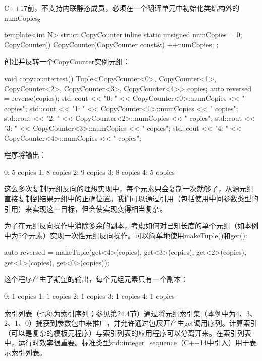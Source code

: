 \begin{notice}
C++17前，不支持内联静态成员，必须在一个翻译单元中初始化类结构外的numCopies。
\end{notice}

\begin{cpp}
template<int N>
struct CopyCounter
{
	inline static unsigned numCopies = 0;
	CopyCounter() {
	}
	CopyCounter(CopyCounter const&) {
		++numCopies;
	}
};
\end{cpp}

创建并反转一个CopyCounter实例元组：

\begin{cpp}
void copycountertest()
{
	Tuple<CopyCounter<0>, CopyCounter<1>, CopyCounter<2>,
			CopyCounter<3>, CopyCounter<4>> copies;
	auto reversed = reverse(copies);
	std::cout << "0: " << CopyCounter<0>::numCopies << " copies\n";
	std::cout << "1: " << CopyCounter<1>::numCopies << " copies\n";
	std::cout << "2: " << CopyCounter<2>::numCopies << " copies\n";
	std::cout << "3: " << CopyCounter<3>::numCopies << " copies\n";
	std::cout << "4: " << CopyCounter<4>::numCopies << " copies\n";
}
\end{cpp}

程序将输出：

\begin{shell}
0: 5 copies
1: 8 copies
2: 9 copies
3: 8 copies
4: 5 copies
\end{shell}

这么多次复制!元组反向的理想实现中，每个元素只会复制一次就够了，从源元组直接复制到结果元组中的正确位置。我们可以通过引用（包括使用中间参数类型的引用）来实现这一目标，但会使实现变得相当复杂。

为了在元组反向操作中消除多余的副本，考虑如何对已知长度的单个元组（如本例中为5个元素）实现一次性元组反向操作。可以简单地使用makeTuple()和get():

\begin{cpp}
auto reversed = makeTuple(get<4>(copies), get<3>(copies),
							get<2>(copies), get<1>(copies),
							get<0>(copies));
\end{cpp}

这个程序产生了期望的输出，每个元组元素只有一个副本：

\begin{shell}
0: 1 copies
1: 1 copies
2: 1 copies
3: 1 copies
4: 1 copies
\end{shell}

索引列表（也称为索引序列；参见第24.4节）通过将元组索引集（本例中为4、3、2、1、0）捕获到参数包中来推广，并允许通过包展开产生get调用序列。计算索引（可以是复杂的模板元程序）与索引列表的应用程序可以分离开来。在索引列表中，运行时效率很重要。标准类型std::integer\_sequence（C++14中引入）用于表示索引列表。

